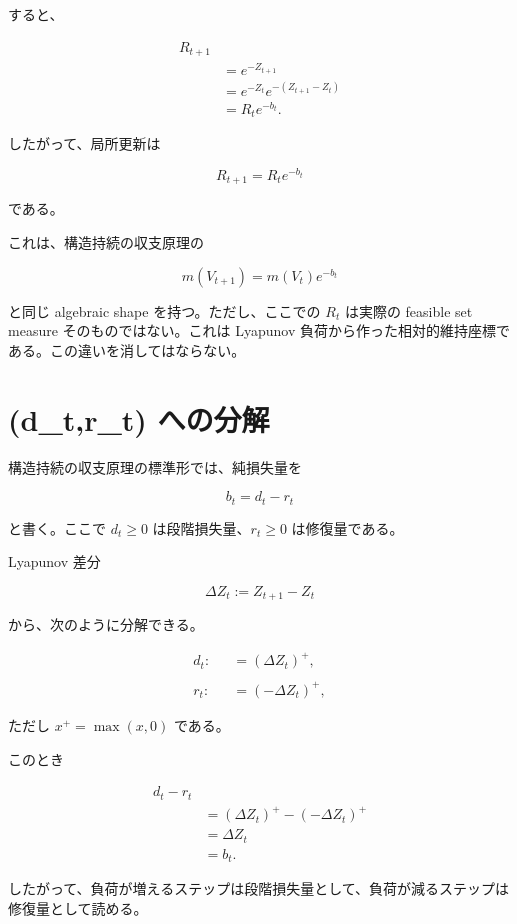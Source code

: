 \documentclass[12pt,a4paper]{article}
\begin{document}
すると、

\[
\begin{aligned}
R_{t+1} \\
&= e^{-Z_{t+1}} \\
&= e^{-Z_{t}}e^{-(Z_{t+1}-Z_{t})} \\
&= R_{t} e^{-b_{t}}.
\end{aligned}
\]

したがって、局所更新は

\[
R_{t+1}=R_{t} e^{-b_{t}}
\]

である。

これは、構造持続の収支原理の

\[
m(V_{t+1})=m(V_{t})e^{-b_{t}}
\]

と同じ algebraic shape を持つ。ただし、ここでの \(R_{t}\) は実際の feasible set measure そのものではない。これは Lyapunov 負荷から作った相対的維持座標である。この違いを消してはならない。

\section{(d\_t,r\_t) への分解}\label{d_tr_t-ux3078ux306eux5206ux89e3}

構造持続の収支原理の標準形では、純損失量を

\[
b_{t}=d_{t}-r_{t}
\]

と書く。ここで \(d_{t}\ge 0\) は段階損失量、\(r_{t}\ge 0\) は修復量である。

Lyapunov 差分

\[
\Delta Z_{t}:=Z_{t+1}-Z_{t}
\]

から、次のように分解できる。

\[
\begin{aligned}
d_{t} :&= (\Delta Z_{t})^+, \\
\qquad \\
r_{t} :&= (-\Delta Z_{t})^+,
\end{aligned}
\]

ただし \(x^+=\max(x,0)\) である。

このとき

\[
\begin{aligned}
d_{t}-r_{t} \\
&= (\Delta Z_{t})^+ - (-\Delta Z_{t})^+ \\
&= \Delta Z_{t} \\
&= b_{t}.
\end{aligned}
\]

したがって、負荷が増えるステップは段階損失量として、負荷が減るステップは修復量として読める。
\end{document}
